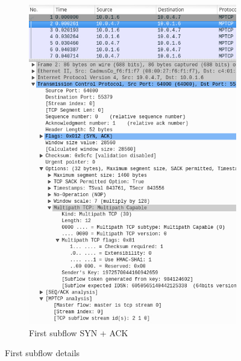 \documentclass[a4paper,11pt]{article}
\begin{document}
\begin{figure}[h!]
\begin{subfigure}{.5\textwidth}
			  \includegraphics[width=0.8\linewidth]{pictures/firstflowresponse.jpg}
			  \caption{First subflow SYN + ACK}
			\end{subfigure}
			\caption{First subflow details}
			\end{figure}
\end{document}
